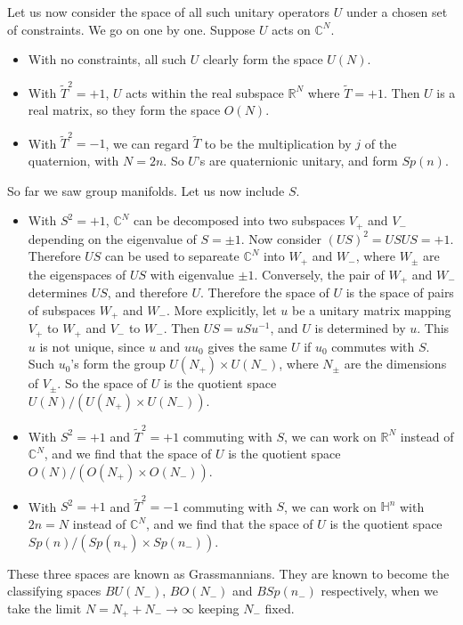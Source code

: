 \documentclass[12pt]{article}
\numberwithin{equation}{section}
\numberwithin{figure}{section}
\theoremstyle{remark}
\def\bC{\mathbb{C}}
\def\bH{\mathbb{H}}
\def\bR{\mathbb{R}}
\begin{document}
Let us now consider the space of all such unitary operators $U$  under a chosen set of constraints. 
We go on one by one. Suppose $U$ acts on $\bC^N$.
\begin{itemize}
\item With no constraints, all such $U$ clearly form the space $U(N)$.
\item With $\tilde T^2=+1$, $U$ acts within the real subspace $\bR^N$ where $\tilde T=+1$.
Then $U$  is a real matrix, so they form the space $O(N)$.
\item With $\tilde T^2=-1$, we can regard $\tilde T$ to be the multiplication by $j$ of the quaternion,
with $N=2n$.
So $U$'s are quaternionic unitary, and form $Sp(n)$.
\end{itemize}
So far we saw group manifolds. Let us now include $S$. 
\begin{itemize}
\item With $S^2=+1$, $\bC^N$ can be decomposed into two subspaces $V_+$ and $V_-$ depending on the eigenvalue of $S=\pm1$.
Now consider $(US)^2=USUS=+1$. Therefore $US$ can be used to separeate $\bC^N$
into $W_+$ and $W_-$, where $W_\pm$ are the eigenspaces of $US$ with eigenvalue $\pm1$. 
Conversely, the pair of $W_+$ and $W_-$ determines $US$, and therefore $U$.
Therefore the space of $U$ is the space of pairs of subspaces $W_+$ and $W_-$.
More explicitly, let $u$ be a unitary matrix mapping $V_+$ to $W_+$ and $V_-$ to $W_-$. 
Then $US=uSu^{-1}$, and $U$ is determined by $u$.
This $u$ is not unique, since $u$ and $uu_0$ gives the same $U$
if $u_0$ commutes with $S$. Such $u_0$'s form the group $U(N_+)\times U(N_-)$, where $N_\pm$ are the dimensions of $V_\pm$.
So the space of $U$ is the quotient space $U(N)/ (U(N_+)\times U(N_-))$.
\item With $S^2=+1$ and $\tilde T^2=+1$ commuting with $S$, we can work on $\bR^N$ instead of $\bC^N$, and we find that the space of $U$ is the quotient space $O(N)/(O(N_+)\times O(N_-))$.
\item With $S^2=+1$ and $\tilde T^2=-1$ commuting with $S$, we can work on $\bH^n$ with $2n=N$ instead of $\bC^N$, and we find that the space of $U$ is the quotient space $Sp(n)/(Sp(n_+)\times Sp(n_-))$.
\end{itemize}
These three spaces are known as Grassmannians.
They are known to become 
the classifying spaces $BU(N_-)$, $BO(N_-)$ and $BSp(n_-)$ respectively,
when we take the limit $N=N_++N_-\to\infty$ keeping $N_-$ fixed.
\end{document}
